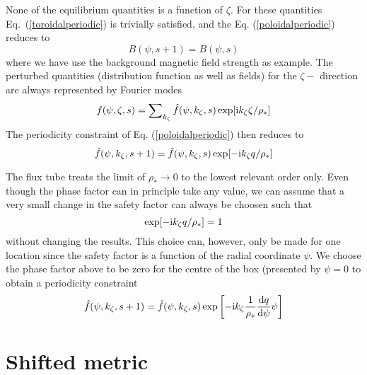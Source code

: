 None of the equilibrium quantities is a function of $\zeta$. For these quantities Eq.~(\ref{toroidalperiodic})
is trivially satisfied, and the Eq. (\ref{poloidalperiodic}) reduces to 
\begin{equation} 
B(\psi,s+1) = B(\psi,s)
\end{equation}
where we have use the background magnetic field strength as example. The perturbed quantities (distribution
function as well as fields) for the $\zeta-$ direction are always represented by Fourier modes 
\begin{equation} 
f(\psi,\zeta,s) = \sum\nolimits_{k_\zeta} \hat f (\psi,k_\zeta,s) \exp [ {\rm i} k_\zeta \zeta / \rho_* ] 
\end{equation} 
The periodicity constraint of Eq. (\ref{poloidalperiodic}) then reduces to 
\begin{equation} 
\hat f(\psi, k_\zeta,s+1) = \hat f (\psi, k_\zeta, s) \exp [ - {\rm i} k_\zeta q / \rho_* ] 
\end{equation}

The flux tube treats the limit of $\rho_* \rightarrow 0$ to the lowest relevant order only. Even though the 
phase factor can in principle take any value, we can assume that a very small change in the safety factor can always be 
choosen such that 
\begin{equation} 
\exp [ - {\rm i} k_\zeta q / \rho_* ]  = 1 
\end{equation}
without changing the results. This choice can, however, only be made for one location since the safety factor is a 
function of the radial coordinate $\psi$. We choose the phase factor above to be zero for the centre of the box (presented
by $\psi = 0$ to obtain a periodicity constraint 
\begin{equation} 
\hat f(\psi, k_\zeta,s+1) = \hat f (\psi, k_\zeta, s) \exp \left [ - {\rm i} k_\zeta {1 \over  \rho_*}{{\rm d} q \over {\rm d} \psi }\psi \right ] 
\end{equation}


\section{Shifted metric} 

